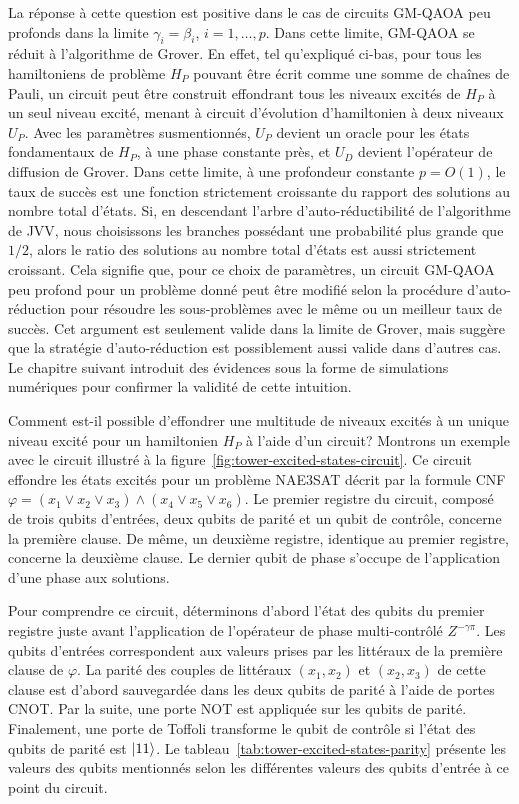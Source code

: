 La réponse à cette question est positive dans le cas de circuits GM-QAOA peu profonds dans la limite $\gamma_{i}=\beta_{i}$, $i=1,\dots,p$. Dans cette limite, GM-QAOA se réduit à l'algorithme de Grover. En effet, tel qu'expliqué ci-bas, pour tous les hamiltoniens de problème $H_{P}$ pouvant être écrit comme une somme de chaînes de Pauli, un circuit peut être construit effondrant tous les niveaux excités de $H_{P}$ à un seul niveau excité, menant à circuit d'évolution d'hamiltonien à deux niveaux $U_{P}$. Avec les paramètres susmentionnés, $U_{P}$ devient un oracle pour les états fondamentaux de $H_{P}$, à une phase constante près, et $U_{D}$ devient l'opérateur de diffusion de Grover. Dans cette limite, à une profondeur constante $p=O(1)$, le taux de succès est une fonction strictement croissante du rapport des solutions au nombre total d'états. Si, en descendant l'arbre d'auto-réductibilité de l'algorithme de JVV, nous choisissons les branches possédant une probabilité plus grande que $1/2$, alors le ratio des solutions au nombre total d'états est aussi strictement croissant. Cela signifie que, pour ce choix de paramètres, un circuit GM-QAOA peu profond pour un problème donné peut être modifié selon la procédure d'auto-réduction pour résoudre les sous-problèmes avec le même ou un meilleur taux de succès. Cet argument est seulement valide dans la limite de Grover, mais suggère que la stratégie d'auto-réduction est possiblement aussi valide dans d'autres cas. Le chapitre suivant introduit des évidences sous la forme de simulations numériques pour confirmer la validité de cette intuition.

Comment est-il possible d'effondrer une multitude de niveaux excités à un unique niveau excité pour un hamiltonien $H_{P}$ à l'aide d'un circuit? Montrons un exemple avec le circuit illustré à la figure~\ref{fig:tower-excited-states-circuit}. Ce circuit effondre les états excités pour un problème NAE3SAT décrit par la formule CNF $\varphi = (x_{1} \lor x_{2} \lor x_{3}) \land (x_{4} \lor x_{5} \lor x_{6})$. Le premier registre du circuit, composé de trois qubits d'entrées, deux qubits de parité et un qubit de contrôle, concerne la première clause. De même, un deuxième registre, identique au premier registre, concerne la deuxième clause. Le dernier qubit de phase s'occupe de l'application d'une phase aux solutions.

Pour comprendre ce circuit, déterminons d'abord l'état des qubits du premier registre juste avant l'application de l'opérateur de phase multi-contrôlé $Z^{-\gamma \pi}$. Les qubits d'entrées correspondent aux valeurs prises par les littéraux de la première clause de $\varphi$. La parité des couples de littéraux $(x_{1}, x_{2})$ et $(x_{2}, x_{3})$ de cette clause est d'abord sauvegardée dans les deux qubits de parité à l'aide de portes CNOT. Par la suite, une porte NOT est appliquée sur les qubits de parité. Finalement, une porte de Toffoli transforme le qubit de contrôle si l'état des qubits de parité est $\ket{11}$. Le tableau~\ref{tab:tower-excited-states-parity} présente les valeurs des qubits mentionnés selon les différentes valeurs des qubits d'entrée à ce point du circuit.

